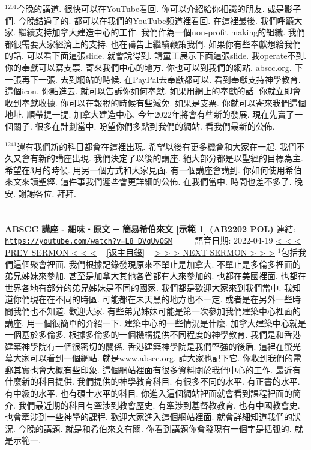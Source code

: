 \documentclass{book}
\begin{document}
$^{1201}$今晚的講道.
很快可以在YouTube看回.
你可以介紹給你相識的朋友.
或是影子們.
今晚錯過了的.
都可以在我們的YouTube頻道裡看回.
在這裡最後.
我們呼籲大家.
繼續支持加拿大建造中心的工作.
我們作為一個non-profit making的組織.
我們都很需要大家經濟上的支持.
也在禱告上繼續鞭策我們.
如果你有些奉獻想給我們的話.
可以看下面這張slide.
就會說得到.
請童工展示下面這張slide.
我operate不到.
你的奉獻可以寫支票.
寄來我們中心的地方.
你也可以到我們的網站.
abscc.org.
下一張再下一張.
去到網站的時候.
在PayPal去奉獻都可以.
看到奉獻支持神學教育.
這個icon.
你點進去.
就可以告訴你如何奉獻.
如果用網上的奉獻的話.
你就立即會收到奉獻收據.
你可以在報稅的時候有些減免.
如果是支票.
你就可以寄來我們這個地址.
順帶提一提.
加拿大建造中心.
今年2022年將會有些新的發展.
現在先賣了一個關子.
很多在計劃當中.
盼望你們多點到我們的網站.
看我們最新的公佈.

$^{1241}$還有我們新的科目都會在這裡出現.
希望以後有更多機會和大家在一起.
我們不久又會有新的講座出現.
我們決定了以後的講座.
絕大部分都是以聖經的目標為主.
希望在3月的時候.
用另一個方式和大家見面.
有一個講座會講到.
你如何使用希伯來文來讀聖經.
這件事我們遲些會更詳細的公佈.
在我們當中.
時間也差不多了.
晚安.
謝謝各位.
拜拜.
\newpage



\section{}
\label{sec:L8_DVqUvOSM}
\textbf{ABSCC 講座 - 細味‧原文 ─ 簡易希伯來文 [示範 1] (AB2202 POL)}
\newline
\newline
連結: \href{https://youtube.com/watch?v=L8_DVqUvOSM}{\texttt{https://youtube.com/watch?v=L8\_DVqUvOSM}} ~~~~ 語音日期: 2022-04-19
\newline
\newline
\hyperref[sec:GA78znQ7bg4]{\small{< < < PREV SERMON < < <}}
~
\hyperref[sec:index]{\small{[返主目錄]}}
~
\hyperref[sec:efm9yyrZOo0]{\small{> > > NEXT SERMON > > >}}
\newline
\newline
$^{1}$包括我們這個聚會裡面.
我們根據記錄發現原來不單止是加拿大.
不單止是多倫多裡面的弟兄姊妹來參加.
甚至是加拿大其他各省都有人來參加的.
也都在美國裡面.
也都在世界各地有部分的弟兄姊妹是不同的國家.
我們都是歡迎大家來到我們當中.
我知道你們現在在不同的時區.
可能都在未天黑的地方也不一定.
或者是在另外一些時間我們也不知道.
歡迎大家.
有些弟兄姊妹可能是第一次參加我們建築中心裡面的講座.
用一個很簡單的介紹一下.
建築中心的一些情況是什麼.
加拿大建築中心就是一個基於多倫多.
根據多倫多的一個機構提供不同程度的神學教育.
我們是和香港建築神學院有一個很密切的關係.
香港建築神學院是我們堅強的後盾.
這裡在螢光幕大家可以看到一個網站.
就是www.abscc.org.
請大家也記下它.
你收到我們的電郵其實也會大概有些印象.
這個網站裡面有很多資料關於我們中心的工作.
最近有什麼新的科目提供.
我們提供的神學教育科目.
有很多不同的水平.
有正書的水平.
有中級的水平.
也有碩士水平的科目.
你進入這個網站裡面就會看到課程裡面的簡介.
我們最近期的科目有牽涉到教會歷史.
有牽涉到基督教教育.
也有中國教會史.
也會牽涉到一些神學的課程.
歡迎大家進入這個網站裡面.
就會詳細知道我們的狀況.
今晚的講題.
就是和希伯來文有關.
你看到講題你會發現有一個字是括弧的.
就是示範一.
\end{document}
